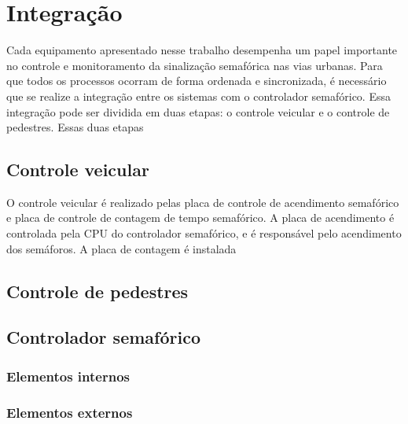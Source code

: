 \chapter{Integração}

Cada equipamento apresentado nesse trabalho desempenha um papel importante no controle e monitoramento da sinalização semafórica nas vias urbanas. Para que todos os processos ocorram de forma ordenada e sincronizada, é necessário que se realize a integração entre os sistemas com o controlador semafórico. Essa integração pode ser dividida em duas etapas: o controle veicular e o controle de pedestres. Essas duas etapas 

\section{Controle veicular}

O controle veicular é realizado pelas placa de controle de acendimento semafórico e placa de controle de contagem de tempo semafórico. A placa de acendimento é controlada pela CPU do controlador semafórico, e é responsável pelo acendimento dos semáforos. A placa de contagem é instalada 

\section{Controle de pedestres}

\section{Controlador semafórico}
\subsection{Elementos internos}
\subsection{Elementos externos}